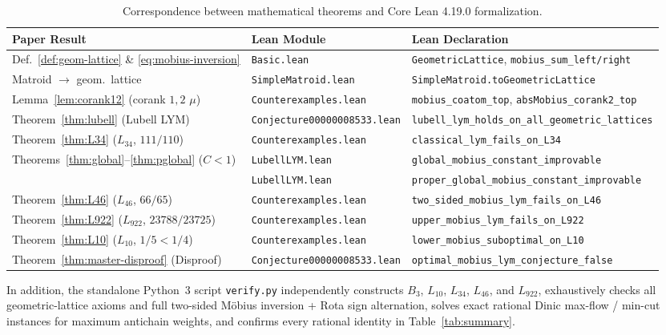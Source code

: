 \documentclass[11pt]{article}
\theoremstyle{definition}
\theoremstyle{remark}
\begin{document}
\begin{table}[htbp]
\centering
\footnotesize
\setlength{\tabcolsep}{4.5pt}
\renewcommand{\arraystretch}{1.2}
\begin{tabular}{@{}lll@{}}
\toprule
\textbf{Paper Result} & \textbf{Lean Module} & \textbf{Lean Declaration} \\
\midrule
Def.~\ref{def:geom-lattice} \& \eqref{eq:mobius-inversion} & \texttt{Basic.lean} & \texttt{GeometricLattice}, \texttt{mobius\_sum\_left/right} \\
Matroid $\to$ geom.\ lattice & \texttt{SimpleMatroid.lean} & \texttt{SimpleMatroid.toGeometricLattice} \\
Lemma~\ref{lem:corank12} (corank $1, 2$ $\mu$) & \texttt{Counterexamples.lean} & \texttt{mobius\_coatom\_top}, \texttt{absMobius\_corank2\_top} \\
Theorem~\ref{thm:lubell} (Lubell LYM) & \texttt{Conjecture00000008533.lean} & \texttt{lubell\_lym\_holds\_on\_all\_geometric\_lattices} \\
Theorem~\ref{thm:L34} ($L_{34}$, $111/110$) & \texttt{Counterexamples.lean} & \texttt{classical\_lym\_fails\_on\_L34} \\
Theorems~\ref{thm:global}--\ref{thm:pglobal} ($C < 1$) & \texttt{LubellLYM.lean} & \texttt{global\_mobius\_constant\_improvable} \\
& \texttt{LubellLYM.lean} & \texttt{proper\_global\_mobius\_constant\_improvable} \\
Theorem~\ref{thm:L46} ($L_{46}$, $66/65$) & \texttt{Counterexamples.lean} & \texttt{two\_sided\_mobius\_lym\_fails\_on\_L46} \\
Theorem~\ref{thm:L922} ($L_{922}$, $23788/23725$) & \texttt{Counterexamples.lean} & \texttt{upper\_mobius\_lym\_fails\_on\_L922} \\
Theorem~\ref{thm:L10} ($L_{10}$, $1/5 < 1/4$) & \texttt{Counterexamples.lean} & \texttt{lower\_mobius\_suboptimal\_on\_L10} \\
Theorem~\ref{thm:master-disproof} (Disproof) & \texttt{Conjecture00000008533.lean} & \texttt{optimal\_mobius\_lym\_conjecture\_false} \\
\bottomrule
\end{tabular}
\caption{Correspondence between mathematical theorems and Core Lean 4.19.0 formalization.}
\label{tab:lean-map}
\end{table}

In addition, the standalone Python~3 script \texttt{verify.py} independently constructs $B_3$, $L_{10}$, $L_{34}$, $L_{46}$, and $L_{922}$, exhaustively checks all geometric-lattice axioms and full two-sided M\"obius inversion + Rota sign alternation, solves exact rational Dinic max-flow / min-cut instances for maximum antichain weights, and confirms every rational identity in Table~\ref{tab:summary}.
\end{document}
